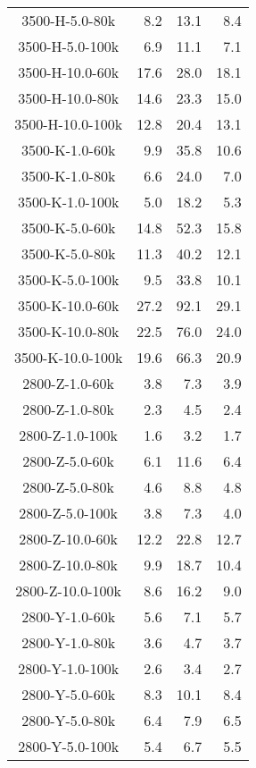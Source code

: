 \begin{longtable}{crrr}
    3500-H-5.0-80k   &    8.2 &   13.1 &    8.4 \\
    3500-H-5.0-100k  &    6.9 &   11.1 &    7.1 \\
    3500-H-10.0-60k  &   17.6 &   28.0 &   18.1 \\
    3500-H-10.0-80k  &   14.6 &   23.3 &   15.0 \\
    3500-H-10.0-100k &   12.8 &   20.4 &   13.1 \\
    3500-K-1.0-60k   &    9.9 &   35.8 &   10.6 \\
    3500-K-1.0-80k   &    6.6 &   24.0 &    7.0 \\
    3500-K-1.0-100k  &    5.0 &   18.2 &    5.3 \\
    3500-K-5.0-60k   &   14.8 &   52.3 &   15.8 \\
    3500-K-5.0-80k   &   11.3 &   40.2 &   12.1 \\
    3500-K-5.0-100k  &    9.5 &   33.8 &   10.1 \\
    3500-K-10.0-60k  &   27.2 &   92.1 &   29.1 \\
    3500-K-10.0-80k  &   22.5 &   76.0 &   24.0 \\
    3500-K-10.0-100k &   19.6 &   66.3 &   20.9 \\
    2800-Z-1.0-60k   &    3.8 &    7.3 &    3.9 \\
    2800-Z-1.0-80k   &    2.3 &    4.5 &    2.4 \\
    2800-Z-1.0-100k  &    1.6 &    3.2 &    1.7 \\
    2800-Z-5.0-60k   &    6.1 &   11.6 &    6.4 \\
    2800-Z-5.0-80k   &    4.6 &    8.8 &    4.8 \\
    2800-Z-5.0-100k  &    3.8 &    7.3 &    4.0 \\
    2800-Z-10.0-60k  &   12.2 &   22.8 &   12.7 \\
    2800-Z-10.0-80k  &    9.9 &   18.7 &   10.4 \\
    2800-Z-10.0-100k &    8.6 &   16.2 &    9.0 \\
    2800-Y-1.0-60k   &    5.6 &    7.1 &    5.7 \\
    2800-Y-1.0-80k   &    3.6 &    4.7 &    3.7 \\
    2800-Y-1.0-100k  &    2.6 &    3.4 &    2.7 \\
    2800-Y-5.0-60k   &    8.3 &   10.1 &    8.4 \\
    2800-Y-5.0-80k   &    6.4 &    7.9 &    6.5 \\
    2800-Y-5.0-100k  &    5.4 &    6.7 &    5.5 \\

\end{longtable}
